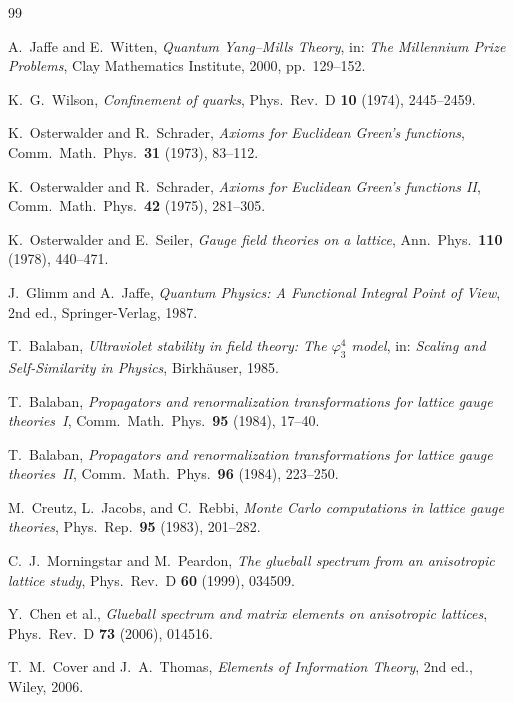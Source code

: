 \documentclass[12pt,a4paper]{article}
\theoremstyle{definition}
\theoremstyle{plain}
\theoremstyle{remark}
\begin{document}
\begin{thebibliography}{99}

A.~Jaffe and E.~Witten, \emph{Quantum Yang--Mills Theory}, in: \emph{The Millennium Prize Problems}, Clay Mathematics Institute, 2000, pp.~129--152.

K.~G.~Wilson, \emph{Confinement of quarks}, Phys.\ Rev.\ D \textbf{10} (1974), 2445--2459.

K.~Osterwalder and R.~Schrader, \emph{Axioms for Euclidean Green's functions}, Comm.\ Math.\ Phys.\ \textbf{31} (1973), 83--112.

K.~Osterwalder and R.~Schrader, \emph{Axioms for Euclidean Green's functions II}, Comm.\ Math.\ Phys.\ \textbf{42} (1975), 281--305.

K.~Osterwalder and E.~Seiler, \emph{Gauge field theories on a lattice}, Ann.\ Phys.\ \textbf{110} (1978), 440--471.

J.~Glimm and A.~Jaffe, \emph{Quantum Physics: A Functional Integral Point of View}, 2nd ed., Springer-Verlag, 1987.

T.~Balaban, \emph{Ultraviolet stability in field theory: The $\varphi^4_3$ model}, in: \emph{Scaling and Self-Similarity in Physics}, Birkh\"auser, 1985.

T.~Balaban, \emph{Propagators and renormalization transformations for lattice gauge theories~I}, Comm.\ Math.\ Phys.\ \textbf{95} (1984), 17--40.

T.~Balaban, \emph{Propagators and renormalization transformations for lattice gauge theories~II}, Comm.\ Math.\ Phys.\ \textbf{96} (1984), 223--250.

M.~Creutz, L.~Jacobs, and C.~Rebbi, \emph{Monte Carlo computations in lattice gauge theories}, Phys.\ Rep.\ \textbf{95} (1983), 201--282.

C.~J.~Morningstar and M.~Peardon, \emph{The glueball spectrum from an anisotropic lattice study}, Phys.\ Rev.\ D \textbf{60} (1999), 034509.

Y.~Chen et al., \emph{Glueball spectrum and matrix elements on anisotropic lattices}, Phys.\ Rev.\ D \textbf{73} (2006), 014516.

T.~M.~Cover and J.~A.~Thomas, \emph{Elements of Information Theory}, 2nd ed., Wiley, 2006.


\end{thebibliography}
\end{document}
